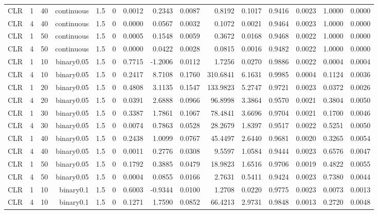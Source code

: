 \begin{longtable}{rrrrrrrrrrrrrrr}
  CLR & 1 & 40 & continuous & 1.5 & 0 & 0.0012 & 0.2343 & 0.0087 & 0.8192 & 0.1017 & 0.9416 & 0.0023 & 1.0000 & 0.0000 \\ 
  CLR & 4 & 40 & continuous & 1.5 & 0 & 0.0000 & 0.0567 & 0.0032 & 0.1072 & 0.0021 & 0.9464 & 0.0023 & 1.0000 & 0.0000 \\ 
  CLR & 1 & 50 & continuous & 1.5 & 0 & 0.0005 & 0.1548 & 0.0059 & 0.3672 & 0.0168 & 0.9468 & 0.0022 & 1.0000 & 0.0000 \\ 
  CLR & 4 & 50 & continuous & 1.5 & 0 & 0.0000 & 0.0422 & 0.0028 & 0.0815 & 0.0016 & 0.9482 & 0.0022 & 1.0000 & 0.0000 \\ 
  CLR & 1 & 10 & binary0.05 & 1.5 & 0 & 0.7715 & -1.2006 & 0.0112 & 1.7256 & 0.0270 & 0.9886 & 0.0022 & 0.0004 & 0.0004 \\ 
  CLR & 4 & 10 & binary0.05 & 1.5 & 0 & 0.2417 & 8.7108 & 0.1760 & 310.6841 & 6.1631 & 0.9985 & 0.0004 & 0.1124 & 0.0036 \\ 
  CLR & 1 & 20 & binary0.05 & 1.5 & 0 & 0.4808 & 3.1135 & 0.1547 & 133.9823 & 5.2747 & 0.9721 & 0.0023 & 0.0372 & 0.0026 \\ 
  CLR & 4 & 20 & binary0.05 & 1.5 & 0 & 0.0391 & 2.6888 & 0.0966 & 96.8998 & 3.3864 & 0.9570 & 0.0021 & 0.3804 & 0.0050 \\ 
  CLR & 1 & 30 & binary0.05 & 1.5 & 0 & 0.3387 & 1.7861 & 0.1067 & 78.4841 & 3.6696 & 0.9704 & 0.0021 & 0.1700 & 0.0046 \\ 
  CLR & 4 & 30 & binary0.05 & 1.5 & 0 & 0.0074 & 0.7863 & 0.0528 & 28.2679 & 1.8397 & 0.9517 & 0.0022 & 0.5251 & 0.0050 \\ 
  CLR & 1 & 40 & binary0.05 & 1.5 & 0 & 0.2438 & 1.0099 & 0.0767 & 45.4497 & 2.6440 & 0.9681 & 0.0020 & 0.3265 & 0.0054 \\ 
  CLR & 4 & 40 & binary0.05 & 1.5 & 0 & 0.0011 & 0.2776 & 0.0308 & 9.5597 & 1.0584 & 0.9444 & 0.0023 & 0.6576 & 0.0047 \\ 
  CLR & 1 & 50 & binary0.05 & 1.5 & 0 & 0.1792 & 0.3885 & 0.0479 & 18.9823 & 1.6516 & 0.9706 & 0.0019 & 0.4822 & 0.0055 \\ 
  CLR & 4 & 50 & binary0.05 & 1.5 & 0 & 0.0004 & 0.0855 & 0.0166 & 2.7631 & 0.5411 & 0.9424 & 0.0023 & 0.7380 & 0.0044 \\ 
  CLR & 1 & 10 & binary0.1 & 1.5 & 0 & 0.6003 & -0.9344 & 0.0100 & 1.2708 & 0.0220 & 0.9775 & 0.0023 & 0.0073 & 0.0013 \\ 
  CLR & 4 & 10 & binary0.1 & 1.5 & 0 & 0.1271 & 1.7590 & 0.0852 & 66.4213 & 2.9731 & 0.9848 & 0.0013 & 0.2720 & 0.0048 \\ 

\end{longtable}
